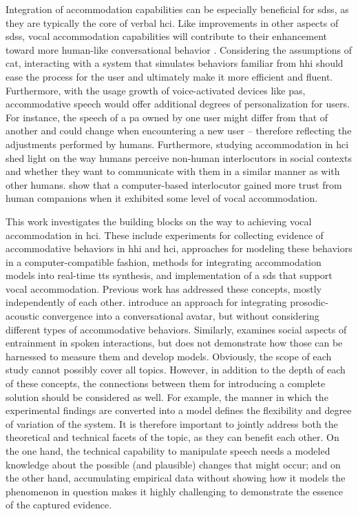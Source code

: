 Integration of accommodation capabilities can be especially beneficial for \aclp{sds}, as they are typically the core of verbal \acl{hci}.
Like improvements in other aspects of \aclp{sds}, vocal accommodation capabilities will contribute to their enhancement toward more human-like conversational behavior \citep{Weise2017towards}.
Considering the assumptions of \acl{cat}, interacting with a system that simulates behaviors familiar from \acl{hhi} should ease the process for the user and ultimately make it more efficient and fluent.
Furthermore, with the usage growth of voice-activated devices like \aclp{pa}, accommodative speech would offer additional degrees of personalization for users.
For instance, the speech of a \acl{pa} owned by one user might differ from that of another and could change when encountering a new user -- therefore reflecting the adjustments performed by humans.
Furthermore, studying accommodation in \acl{hci} shed light on the way humans perceive non-human interlocutors in social contexts and whether they want to communicate with them in a similar manner as with other humans.
\citet{Benus2018prosodic} show that a computer-based interlocutor gained more trust from human companions when it exhibited some level of vocal accommodation.

This work investigates the building blocks on the way to achieving vocal accommodation in \acl{hci}.
These include experiments for collecting evidence of accommodative behaviors in \acl{hhi} and \acl{hci}, approaches for modeling these behaviors in a computer-compatible fashion, methods for integrating accommodation models into real-time \acl{tts} synthesis, and implementation of a \acl{sds} that support vocal accommodation.
Previous work has addressed these concepts, mostly independently of each other.
\citet{Levitan2016implementing} introduce an approach for integrating prosodic-acoustic convergence into a conversational avatar, but without considering different types of accommodative behaviors.
Similarly, \citet{Bevnuvs2014social} examines social aspects of entrainment in spoken interactions, but does not demonstrate how those can be harnessed to measure them and develop models.
Obviously, the scope of each study cannot possibly cover all topics.
However, in addition to the depth of each of these concepts, the connections between them for introducing a complete solution should be considered as well.
For example, the manner in which the experimental findings are converted into a model defines the flexibility and degree of variation of the system.
It is therefore important to jointly address both the theoretical and technical facets of the topic, as they can benefit each other.
On the one hand, the technical capability to manipulate speech needs a modeled knowledge about the possible (and plausible) changes that might occur; and on the other hand, accumulating empirical data without showing how it models the phenomenon in question makes it highly challenging to demonstrate the essence of the captured evidence.


